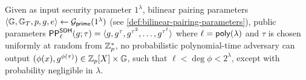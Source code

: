 \begin{definition}
\label{def:q-polydh}
Given as input security parameter $1^\lambda$, bilinear pairing parameters $\langle \mathbb{G}, \mathbb{G}_T, p, g, e\rangle \leftarrow \mathcal{G}_{\mathsf{prime}}(1^\lambda)$ (see \cref{def:bilinear-pairing-parameters}),
public parameters $\mathsf{PP}^\mathsf{SDH}_\ell(g;\tau)=\langle g, g^\tau, g^{\tau^2}, \dots, g^{\tau^\ell}\rangle$ where $\ell = \mathsf{poly}(\lambda)$ and $\tau$ is chosen uniformly at random from $\mathbb{Z}_p^*$, no probabilistic polynomial-time adversary can output $(\phi(x), g^{\phi(\tau)}) \in \mathbb{Z}_p[X]\times \mathbb{G}$, such that $\ell < \deg{\phi} < 2^\lambda$, except with probability negligible in $\lambda$.
\end{definition}
